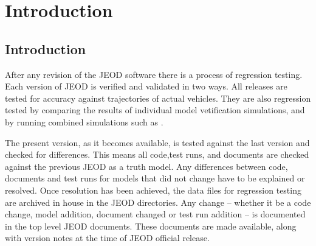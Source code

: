 \documentclass[twoside,11pt,titlepage]{report}
\begin{document}

\date{\RELEASEMONTH\ \RELEASEYEAR}
\modelname{\DYNCOMPDesc}
\doctype{}
\author{\ModelAuthor}
\makeDynenvTitlepage



\tableofcontents
\vfill

\pagebreak

\setcounter{chapter}{0}

\chapter{Introduction}\label{ch:intro}
\section{Introduction}
After any revision of the JEOD software there is a process of regression
testing. Each version of JEOD is verified and validated in two ways.  All releases
are tested for accuracy against trajectories of actual vehicles.  They are also
regression tested by comparing the results of individual model vetification
simulations, and by running combined simulations such as \DYNCOMPDesc.


The present version, as it becomes available, is tested against the last version
and checked for differences. This means all code,test runs, and documents are
checked against the previous JEOD as a truth model. Any differences between code,
documents and test runs for models that did not change have to be explained or
resolved.
Once resolution has been achieved, the data files for regression testing are
archived in
house in the JEOD directories. Any change -- whether it be a code change, model
addition, document changed or test run addition -- is documented in the top
level JEOD documents.
These documents are made
available, along with version notes at the time of JEOD official release.
\end{document}
